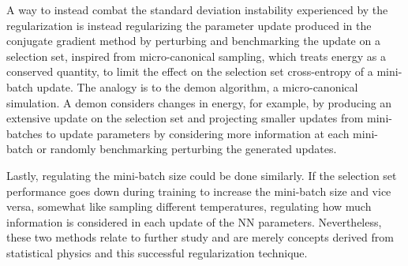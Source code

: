 A way to instead combat the standard deviation instability experienced by the regularization is instead regularizing the parameter update produced in the conjugate gradient method by perturbing and benchmarking the update on a selection set, inspired from micro-canonical sampling, which treats energy as a conserved quantity, to limit the effect on the selection set cross-entropy of a mini-batch update. The analogy is to the demon algorithm, a micro-canonical simulation. A demon considers changes in energy, for example, by producing an extensive update on the selection set and projecting smaller updates from mini-batches to update parameters by considering more information at each mini-batch or randomly benchmarking perturbing the generated updates.

Lastly, regulating the mini-batch size could be done similarly. If the selection set performance goes down during training to increase the mini-batch size and vice versa, somewhat like sampling different temperatures, regulating how much information is considered in each update of the NN parameters. Nevertheless, these two methods relate to further study and are merely concepts derived from statistical physics and this successful regularization technique.